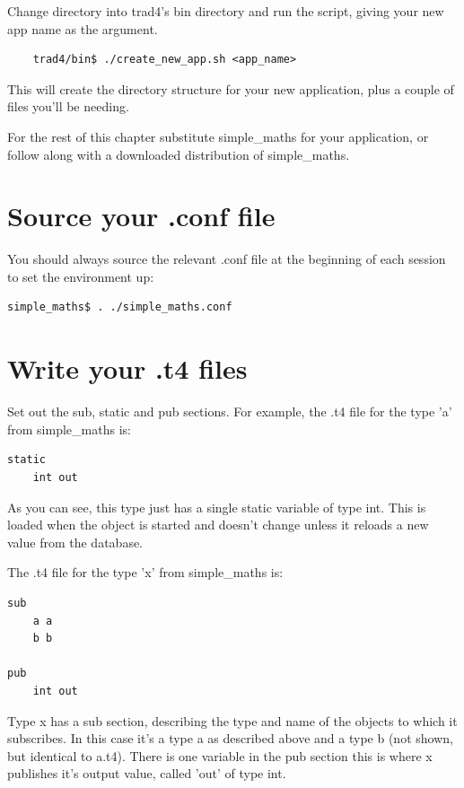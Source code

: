 \documentclass{report}
\begin{document}
Change directory into trad4's bin directory and run the script, giving your new app name as the argument.

\begin{verbatim}
    trad4/bin$ ./create_new_app.sh <app_name>
\end{verbatim}

This will create the directory structure for your new application, plus a couple of files you'll be needing.

For the rest of this chapter substitute simple_maths for your application, or follow along with a downloaded  distribution of simple_maths.

\section{Source your .conf file}

You should always source the relevant .conf file at the beginning of each session to set the environment  up:

\begin{verbatim}
simple_maths$ . ./simple_maths.conf
\end{verbatim}

\section{Write your .t4 files}

Set out the sub, static and pub sections. For example, the .t4 file for the type 'a' from simple_maths is:

\begin{verbatim}
static
    int out
\end{verbatim}

As you can see, this type just has a single static variable of type int. This is loaded when the object is started and doesn't change unless it reloads a new value from the database.

The .t4 file for the type 'x' from simple_maths is:

\begin{verbatim}
sub
    a a
    b b

pub 
    int out
\end{verbatim}

Type x has a sub section, describing the type and name of the objects to which it subscribes. In this case it's a type a as described above and a type b (not shown, but identical to a.t4). There is one variable in the pub section this is where x publishes it's output value, called 'out' of type int.
\end{document}
